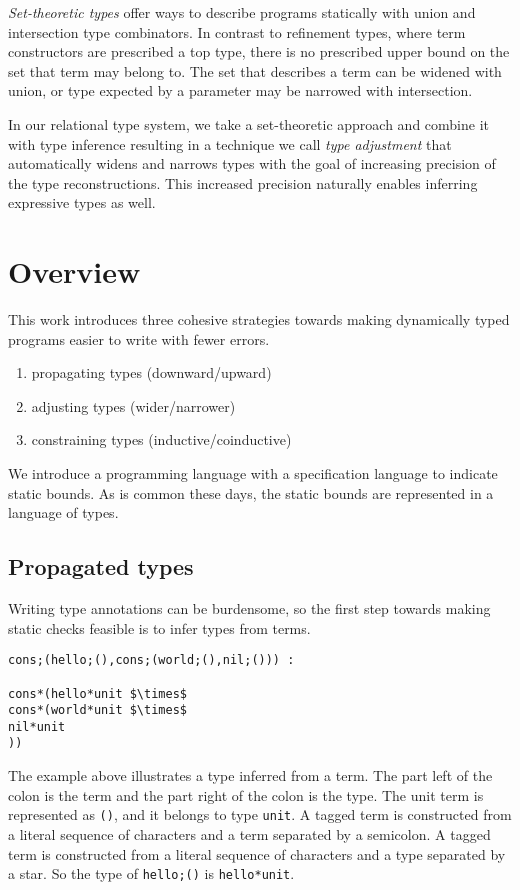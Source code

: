 \documentclass[sigplan]{acmart}
\theoremstyle{definition}
\begin{document}
\textit{Set-theoretic types} offer ways to describe programs statically 
with union and intersection type combinators. 
In contrast to refinement types, where term constructors are prescribed a top type,
there is no prescribed upper bound on the set that term may belong to. The set that describes
a term can be widened with union, or type expected by a parameter may be narrowed with intersection. 

In our relational type system, we take a set-theoretic approach and combine it with type inference
resulting in a technique we call \textit{type adjustment} that automatically widens and narrows types
with the goal of increasing precision of the type reconstructions. This increased precision naturally
enables inferring expressive types as well.

\section{Overview}

This work introduces three cohesive strategies towards making
dynamically typed programs easier to write with fewer errors.  
\begin{enumerate}
  \item propagating types (downward/upward) 
  \item adjusting types (wider/narrower) 
  \item constraining types (inductive/coinductive) 
\end{enumerate}
We introduce a programming language with a specification language to indicate static bounds. 
As is common these days, the static bounds are represented in a language of types.

\subsection{Propagated types}
Writing type annotations can be burdensome, so the first step 
towards making static checks feasible is to infer types from terms.

\begin{lstlisting}
cons;(hello;(),cons;(world;(),nil;())) : 

cons*(hello*unit $\times$ 
cons*(world*unit $\times$ 
nil*unit
))
\end{lstlisting}

\noindent The example above illustrates a type inferred from a term.
The part left of the colon is the term and the part right of the colon is the type.
The unit term is represented as \lstinline{()}, and it belongs to type \lstinline{unit}. 
A tagged term is constructed from a literal sequence of characters and a term separated
by a semicolon. A tagged term is constructed from a literal sequence of characters
and a type separated by a star.
So the type of \lstinline{hello;()} is \lstinline{hello*unit}.
\end{document}
